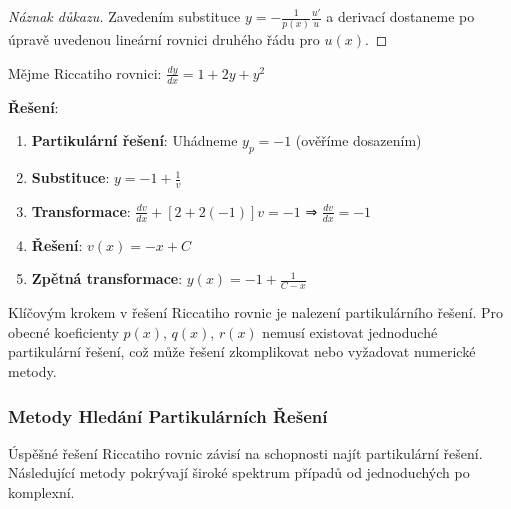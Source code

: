 \vspace{0.6\baselineskip}

\begin{proof}[Náznak důkazu]
Zavedením substituce $y = -\frac{1}{p(x)}\frac{u'}{u}$ a derivací dostaneme po úpravě 
uvedenou lineární rovnici druhého řádu pro $u(x)$.
\end{proof}

\vspace{0.8\baselineskip}

\begin{example}
\label{ex:ilustrace-transformace}
Mějme Riccatiho rovnici: $\frac{dy}{dx} = 1 + 2y + y^2$

\textbf{Řešení}:
\begin{enumerate}
\item \textbf{Partikulární řešení}: Uhádneme $y_p = -1$ (ověříme dosazením)
\item \textbf{Substituce}: $y = -1 + \frac{1}{v}$
\item \textbf{Transformace}: $\frac{dv}{dx} + [2 + 2(-1)]v = -1$ ⇒ $\frac{dv}{dx} = -1$
\item \textbf{Řešení}: $v(x) = -x + C$
\item \textbf{Zpětná transformace}: $y(x) = -1 + \frac{1}{C - x}$
\end{enumerate}
\end{example}

\vspace{0.8\baselineskip}

\begin{remark}
\label{rem:dolezitost-partikularniho}
Klíčovým krokem v řešení Riccatiho rovnic je nalezení partikulárního řešení. Pro obecné 
koeficienty $p(x)$, $q(x)$, $r(x)$ nemusí existovat jednoduché partikulární řešení, 
což může řešení zkomplikovat nebo vyžadovat numerické metody.
\end{remark}

\vspace{0.8\baselineskip}

\subsubsection{Metody Hledání Partikulárních Řešení}
\label{subsubsec:metody-partikularni-reseni}

Úspěšné řešení Riccatiho rovnic závisí na schopnosti najít partikulární řešení. Následující metody pokrývají široké spektrum případů od jednoduchých po komplexní.

